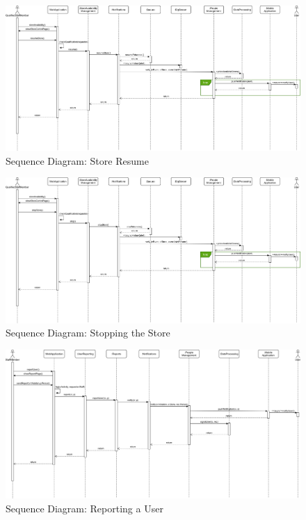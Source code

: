 \begin{landscape}

\begin{figure}[H]
	\includegraphics[width=\linewidth]{../Diagrams/Sequence/sequence_store_resume.png}
	\caption{Sequence Diagram: Store Resume}
	\label{fig:sStoreRes}
\end{figure}

\begin{figure}[H]
	\includegraphics[width=\linewidth]{../Diagrams/Sequence/sequence_store_override.png}
	\caption{Sequence Diagram: Stopping the Store}
	\label{fig:sStoreOver}
\end{figure}

\begin{figure}[H]
	\includegraphics[width=\linewidth]{../Diagrams/Sequence/sequence_user_report.png}
	\caption{Sequence Diagram: Reporting a User}
	\label{fig:sUserRep}
\end{figure}


\end{landscape}
